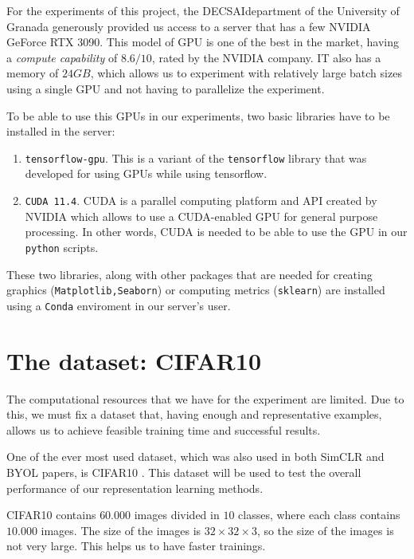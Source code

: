 For the experiments of this project, the DECSAI\footnotemark department of the University of Granada generously provided us access to a server that has a few NVIDIA GeForce RTX 3090. This model of GPU is one of the best in the market, having a \emph{compute capability} of $8.6/10$, rated by the NVIDIA company. IT also has a memory of $24GB$, which allows us to experiment with relatively large batch sizes using a single GPU and not having to parallelize the experiment.



To be able to use this GPUs in our experiments, two basic libraries have to be installed in the server:
\begin{enumerate}
\item \lstinline{tensorflow-gpu}. This is a variant of the \lstinline{tensorflow} library that was developed for using GPUs while using tensorflow.
\item \lstinline{CUDA 11.4}. CUDA is a parallel computing platform and API created by NVIDIA which allows to use a CUDA-enabled GPU for general purpose processing. In other words, CUDA is needed to be able to use the GPU in our \lstinline{python} scripts.
\end{enumerate}

These two libraries, along with other packages that are needed for creating graphics (\lstinline{Matplotlib,Seaborn}) or computing metrics (\lstinline{sklearn}) are installed using a \lstinline{Conda} enviroment in our server's user.


\section{The dataset: CIFAR10}

The computational resources that we have for the experiment are limited. Due to this, we must fix a dataset that, having enough and representative examples, allows us to achieve feasible training time and successful results.

One of the ever most used dataset, which was also used in both SimCLR and BYOL papers, is CIFAR10 \citep{krizhevsky_learning_nodate}. This dataset will be used to test the overall performance of our representation learning methods.

CIFAR10 contains $60.000$ images divided in $10$ classes, where each class contains $10.000$ images. The size of the images is $32\times 32\times 3$, so the size of the images is not very large. This helps us to have faster trainings.


